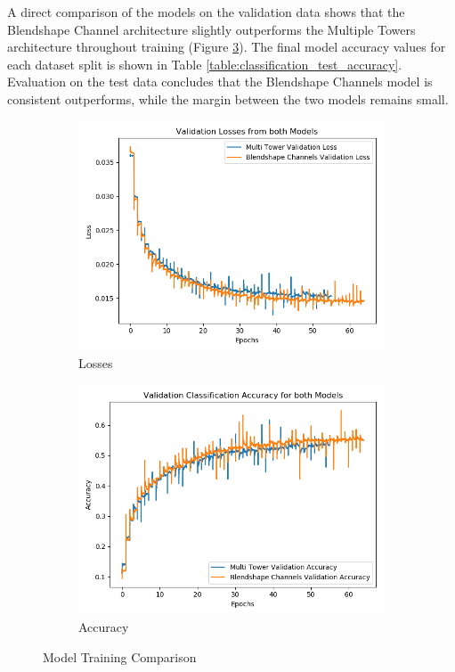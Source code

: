 A direct comparison of the models on the validation data shows that the Blendshape Channel architecture slightly outperforms the Multiple Towers architecture throughout training (Figure \ref{fig:classification_training}).
The final model accuracy values for each dataset split is shown in Table \ref{table:classification_test_accuracy}.
Evaluation on the test data concludes that the Blendshape Channels model is consistent outperforms, while the margin between the two models remains small.

\begin{figure}[h!]
    \centering
    \begin{subfigure}[b]{0.49\textwidth}
        \includegraphics[width=\textwidth]{figures/classification/both_models_val_loss.png}
        \caption{Losses}\label{fig:both_models_val_loss}
    \end{subfigure}
    \begin{subfigure}[b]{0.49\textwidth}
        \includegraphics[width=\textwidth]{figures/classification/both_models_val_acc.png}
        \caption{Accuracy}\label{fig:both_models_val_acc}
    \end{subfigure}
    \caption{Model Training Comparison}\label{fig:classification_training}
\end{figure}

